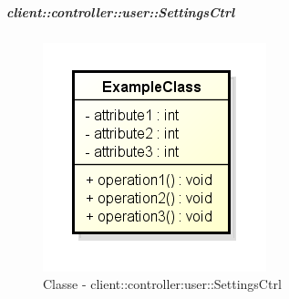 		\subparagraph{client::controller::user::SettingsCtrl} %
		\label{subp:client_controller_user_settingsctrl}
			\begin{figure}[htbp]
				\centering
				\centerline{\includegraphics[scale=0.7]{./images/client/classes/example_class.png}}
				\caption{Classe - client::controller:user::SettingsCtrl}
			\end{figure}

